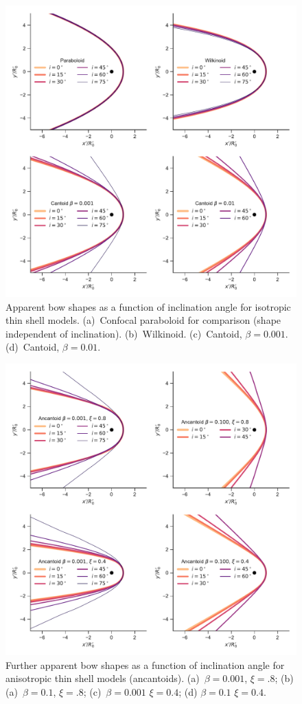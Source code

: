 \begin{figure}
  \centering
  \includegraphics[width=0.8\linewidth]{figs/test_xyprime}
  \caption{Apparent bow shapes as a function of inclination angle for
    isotropic thin shell models. (a)~Confocal paraboloid for
    comparison (shape independent of inclination).
    (b)~Wilkinoid. (c)~Cantoid, \(\beta = 0.001\). (d)~Cantoid,
    \(\beta = 0.01\). }
  \label{fig:xyprime}
\end{figure}

\begin{figure}
  \centering
  \includegraphics[width=0.8\linewidth]{figs/test_xyprime_ancantoid}
  \caption{Further apparent bow shapes as a function of inclination
    angle for anisotropic thin shell models (ancantoids).
    (a)~\(\beta = 0.001\), \(\xi =.8\); (b) (a)~\(\beta = 0.1\),
    \(\xi =.8\); (c)~\(\beta = 0.001\) \(\xi =0.4\); (d)
    \(\beta = 0.1\) \(\xi =0.4\).}
  \label{fig:xyprime-anacantoid}
\end{figure}


